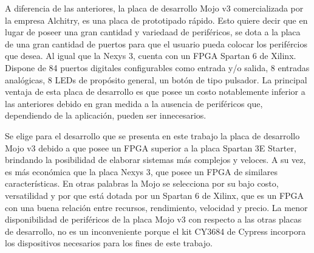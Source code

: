 A diferencia de las anteriores, la placa de desarrollo Mojo v3 comercializada por la empresa Alchitry, es una placa de prototipado rápido. Esto quiere decir que en lugar de poseer una gran cantidad y variedaad de periféricos, se dota a la placa de una gran cantidad de puertos para que el usuario pueda colocar los perifércios que desea. Al igual que la Nexys 3, cuenta con un FPGA Spartan 6 de Xilinx. Dispone de 84 puertos digitales configurables como entrada y/o salida, 8 entradas analógicas, 8 LEDs de propósito general, un botón de tipo pulsador. La principal ventaja de esta placa de desarrollo es que posee un costo notablemente inferior a las anteriores debido en gran medida a la ausencia de periféricos que, dependiendo de la aplicación, pueden ser innecesarios.

Se elige para el desarrollo que se presenta en este trabajo la placa de desarrollo Mojo v3 debido a que posee un FPGA superior a la placa Spartan 3E Starter, brindando la posibilidad de elaborar sistemas más complejos y veloces. A su vez, es más económica que la placa Nexys 3, que posee un FPGA de similares características. En otras palabras la Mojo se selecciona por su bajo costo, versatilidad y por que está dotada por un Spartan 6 de Xilinx, que es un FPGA con una buena relación entre recursos, rendimiento, velocidad y precio. La menor disponibilidad de periféricos de la placa Mojo v3 con respecto a las otras placas de desarrollo, no es un inconveniente porque el kit CY3684 de Cypress incorpora los dispositivos necesarios para los fines de este trabajo.
%


